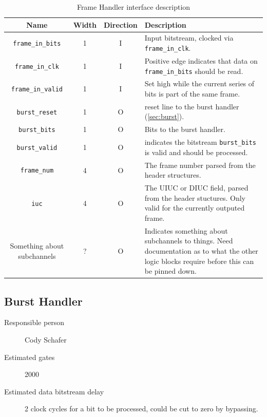 \documentclass[dvips,10pt,twocolumn]{article}
\begin{document}
\begin{table} \begin{tabularx}{\textwidth}{c|c|c|X} \label{tbl:frame-io}
	Name & Width & Direction & Description \\ \hline

	\texttt{frame\_in\_bits} & 1 & I & Input bitstream, clocked via
	\texttt{frame\_in\_clk}. \\

	\texttt{frame\_in\_clk} & 1 & I & Positive edge indicates that data on
	\texttt{frame\_in\_bits} should be read. \\
	
	\texttt{frame\_in\_valid} & 1 & I & Set high while the current series
	of bits is part of the same frame. \\

	\texttt{burst\_reset} & 1 & O & reset line to the burst handler
	(\autoref{sec:burst}). \\

	\texttt{burst\_bits} & 1 & O & Bits to the burst handler. \\

	\texttt{burst\_valid} & 1 & O & indicates the bitstream
	\texttt{burst\_bits} is valid and should be processed. \\


	\texttt{frame\_num} & 4 & O & The frame number parsed from the header
	structures. \\

	\texttt{iuc} & 4 & O & The UIUC or DIUC field, parsed from the header
	stuctures. Only valid for the currently outputed frame. \\

	Something about subchannels & ? & O & Indicates something about
	subchannels to things. Need documentation as to what the other logic
	blocks require before this can be pinned down. \\

\end{tabularx} \caption{Frame Handler interface description} \end{table}


\subsection{Burst Handler} \label{sec:burst}
\begin{description}
	\item[Responsible person] Cody Schafer 
	\item[Estimated gates] 2000 
	\item[Estimated data bitstream delay] 2 clock cycles for a bit to be
		processed, could be cut to zero by bypassing.
\end{description}
\end{document}
